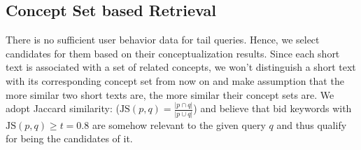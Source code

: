 \subsection{Concept Set based Retrieval}
\label{sec:CSJS}
There is no sufficient user behavior data for tail queries. Hence, we
select candidates for them based on their conceptualization results.
Since each short text is associated with a set of related concepts,
      we won't distinguish a short text with its corresponding concept
      set from now on and make assumption that the more similar two
      short texts are, the more similar their concept sets are.
We adopt Jaccard similarity:
($\text{JS}(p,q)=\frac{\vert{}p\cap{}q\vert{}}{\vert{}p\cup{}q\vert{}}$)
    and believe that bid keywords with $\text{JS}(p,q)\geq{}t=0.8$ are
    somehow relevant to the given query $q$ and thus 
qualify for being the candidates of it.


